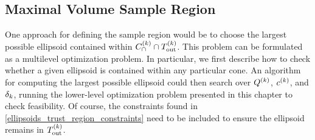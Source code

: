 %





%
%  
%



\subsection{Maximal Volume Sample Region}
\label{ideal_ellipsoid_in_polyhedron}
\label{ellipsoid_in_cone}


One approach for defining the sample region would be to choose the largest possible ellipsoid contained within ${C^{(k)}_{\cap}} \cap {T_{\text{out}}^{(k)}}$.   
This problem can be formulated as a multilevel optimization problem.
In particular, we first describe how to check whether a given ellipsoid is contained within any particular cone.
An algorithm for computing the largest possible ellipsoid could then search over ${Q^{(k)}}$, $c^{(k)}$, and $\delta_k$, running the
lower-level optimization problem presented in this chapter to check feasibility.
Of course, the constraints found in \cref{ellipsoids_trust_region_constraints} need to be included to ensure the ellipsoid remains in ${T_{\text{out}}^{(k)}}$.



